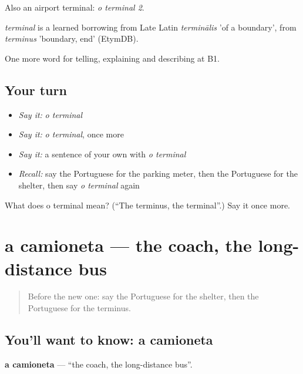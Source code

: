 Also an airport terminal: \emph{o terminal 2}.

\begin{cousinweb}
\emph{terminal} is a learned borrowing from Late Latin \emph{terminālis} 'of a boundary', from \emph{terminus} 'boundary, end' (EtymDB).
\end{cousinweb}

\begin{grammarlens}[title={What you've built}]
One more word for telling, explaining and describing at B1.
\end{grammarlens}

\subsection*{Your turn}
\begin{itemize}
\raggedright
  \item \emph{Say it:} \emph{o terminal}
  \item \emph{Say it:} \emph{o terminal}, once more
  \item \emph{Say it:} a sentence of your own with \emph{o terminal}
  \item \emph{Recall:} say the Portuguese for the parking meter, then the Portuguese for the shelter, then say \emph{o terminal} again
\end{itemize}

\begin{tcolorbox}[breakable,colback=teal!4,colframe=teal!35!black,title={Before you move on}]
What does o terminal mean? (\textquotedblleft{}The terminus, the terminal\textquotedblright{}.) Say it once more.
\end{tcolorbox}
\section[a camioneta]{a camioneta — the coach, the long-distance bus}

\label{lesson:PT-C413-camioneta}



\begin{quote}
Before the new one: say the Portuguese for the shelter, then the Portuguese for the terminus.
\end{quote}

\subsection*{You'll want to know: a camioneta}
\textbf{a camioneta} — \textquotedblleft{}the coach, the long-distance bus\textquotedblright{}.

